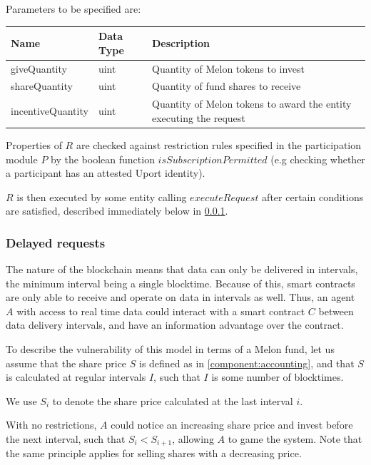 \documentclass[conference]{IEEEtran}
\begin{document}
Parameters to be specified are:

\begin{center}
		\footnotesize
		\begin{tabular}{ | p{2.7cm} | p{1.2cm} | p{4cm} | }
		\hline
		Name & Data Type & Description \\ \hline
		giveQuantity & uint & Quantity of Melon tokens to invest \\ \hline
		shareQuantity & uint & Quantity of fund shares to receive \\ \hline
		incentiveQuantity & uint & Quantity of Melon tokens to award the entity executing the request \\ \hline
	\end{tabular}
\end{center}

Properties of $R$ are checked against restriction rules specified in the participation module $P$ by the boolean function $isSubscriptionPermitted$ (e.g checking whether a participant has an attested Uport identity).

$R$ is then executed by some entity calling $executeRequest$ after certain conditions are satisfied, described immediately below in \ref{delayed-requests}.

\subsubsection{Delayed requests} \label{delayed-requests}

The nature of the blockchain means that data can only be delivered in intervals, the minimum interval being a single blocktime.
Because of this, smart contracts are only able to receive and operate on data in intervals as well.
Thus, an agent $A$ with access to real time data could interact with a smart contract $C$ between data delivery intervals, and have an information advantage over the contract.

To describe the vulnerability of this model in terms of a Melon fund, let us assume that the share price $S$ is defined as in \ref{component:accounting}, and that $S$ is calculated at regular intervals $I$, such that $I$ is some number of blocktimes.

We use $S_i$ to denote the share price calculated at the last interval $i$.

With no restrictions, $A$ could notice an increasing share price and invest before the next interval, such that $S_i < S_{i+1}$, allowing $A$ to game the system.
Note that the same principle applies for selling shares with a decreasing price.
\end{document}
